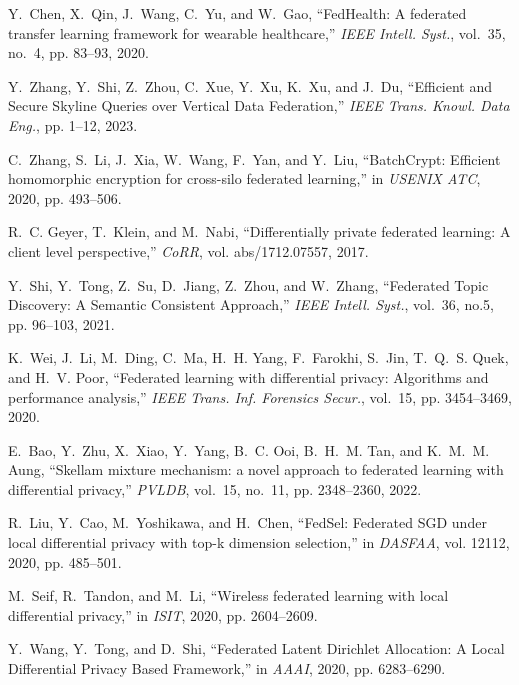 \documentclass[11pt]{article}
\begin{document}
\begin{thebibliography}{10}
Y.~Chen, X.~Qin, J.~Wang, C.~Yu, and W.~Gao, ``{FedHealth}: {A} federated
  transfer learning framework for wearable healthcare,'' \emph{{IEEE} Intell.
  Syst.}, vol.~35, no.~4, pp. 83--93, 2020.

Y.~Zhang, Y.~Shi, Z.~Zhou, C.~Xue, Y.~Xu, K.~Xu, and J.~Du, ``Efficient and Secure Skyline Queries over Vertical Data Federation,'' \emph{{IEEE} Trans. Knowl. Data Eng.}, pp. 1--12, 2023.

C.~Zhang, S.~Li, J.~Xia, W.~Wang, F.~Yan, and Y.~Liu, ``{BatchCrypt}: Efficient
  homomorphic encryption for cross-silo federated learning,'' in \emph{{USENIX}
  {ATC}}, 2020, pp. 493--506.

R.~C. Geyer, T.~Klein, and M.~Nabi, ``Differentially private federated
  learning: {A} client level perspective,'' \emph{CoRR}, vol. abs/1712.07557,
  2017.

Y.~Shi, Y.~Tong, Z.~Su, D.~Jiang, Z.~Zhou, and W.~Zhang, ``Federated Topic Discovery: {A} Semantic Consistent Approach,'' \emph{{IEEE} Intell. Syst.}, vol.~36, no.5, pp. 96--103, 2021.


K.~Wei, J.~Li, M.~Ding, C.~Ma, H.~H. Yang, F.~Farokhi, S.~Jin, T.~Q.~S. Quek,
  and H.~V. Poor, ``Federated learning with differential privacy: Algorithms
  and performance analysis,'' \emph{{IEEE} Trans. Inf. Forensics Secur.},
  vol.~15, pp. 3454--3469, 2020.

E.~Bao, Y.~Zhu, X.~Xiao, Y.~Yang, B.~C. Ooi, B.~H.~M. Tan, and K.~M.~M. Aung,
  ``Skellam mixture mechanism: a novel approach to federated learning with
  differential privacy,'' \emph{{PVLDB}}, vol.~15, no.~11, pp. 2348--2360,
  2022.

R.~Liu, Y.~Cao, M.~Yoshikawa, and H.~Chen, ``{FedSel}: Federated {SGD} under
  local differential privacy with top-k dimension selection,'' in
  \emph{{DASFAA}}, vol. 12112, 2020, pp. 485--501.

M.~Seif, R.~Tandon, and M.~Li, ``Wireless federated learning with local
  differential privacy,'' in \emph{{ISIT}}, 2020, pp. 2604--2609.

Y.~Wang, Y.~Tong, and D.~Shi, ``Federated Latent Dirichlet Allocation: {A} Local Differential Privacy
                  Based Framework,'' in \emph{{AAAI}}, 2020, pp. 6283--6290.


\end{thebibliography}
\end{document}
